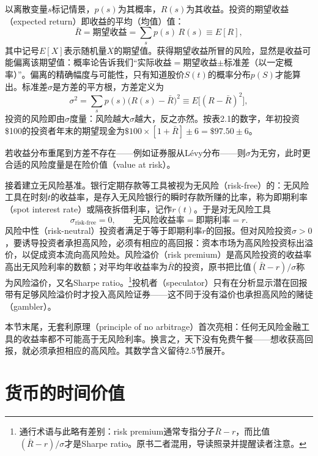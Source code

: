 以离散变量$s$标记情景，$p(s)$为其概率，$R(s)$为其收益。投资的期望收益（expected return）即收益的平均（均值）值：
\begin{equation*}
\bar R=\text{期望收益}=\sum_s p(s)\,R(s)\equiv E[R],
\end{equation*}
其中记号$E[X]$表示随机量$X$的期望值。获得期望收益所冒的风险，显然是收益可能偏离该期望值：概率论告诉我们“实际收益$=$期望收益$\pm$标准差（以一定概率）”。偏离的精确幅度与可能性，只有知道股价$S(t)$的概率分布$p(S)$才能算出。标准差$\sigma$是方差的平方根，方差定义为
\begin{equation*}
\sigma^{2}=\sum_s p(s)\bigl(R(s)-\bar R\bigr)^{2}\equiv E\bigl[(R-\bar R)^{2}\bigr],
\end{equation*}
投资的风险即由$\sigma$度量：风险越大$\sigma$越大，反之亦然。按表2.1的数字，年初投资\$100的投资者年末的期望现金为$\$100\times[1+\bar R]\pm6=\$97.50\pm6$。

若收益分布重尾到方差不存在——例如证券服从Lévy分布——则$\sigma$为无穷，此时更合适的风险度量是在险价值（value at risk）。

接着建立无风险基准。银行定期存款等工具被视为无风险（risk-free）的：无风险工具在时刻$t$的收益率，是存入无风险银行的瞬时存款所赚的比率，称为即期利率（spot interest rate）或隔夜拆借利率，记作$r(t)$。于是对无风险工具
\begin{equation*}
\sigma_{\text{risk-free}}=0,\qquad \text{无风险收益率}=\text{即期利率}=r.
\end{equation*}
风险中性（risk-neutral）投资者满足于等于即期利率$r$的回报。但对风险投资$\sigma>0$，要诱导投资者承担高风险，必须有相应的高回报：资本市场为高风险投资标出溢价，以促成资本流向高风险处。风险溢价（risk premium）是高风险投资的收益率高出无风险利率的数额；对平均年收益率为$\bar R$的投资，原书把比值$(\bar R-r)/\sigma$称为风险溢价，又名Sharpe ratio。\footnote{通行术语与此略有差别：risk premium通常专指分子$\bar R-r$，而比值$(\bar R-r)/\sigma$才是Sharpe ratio。原书二者混用，导读照录并提醒读者注意。}投机者（speculator）只有在分析显示潜在回报带有足够风险溢价时才投入高风险证券——这不同于没有溢价也承担高风险的赌徒（gambler）。

本节末尾，无套利原理（principle of no arbitrage）首次亮相：任何无风险金融工具的收益率都不可能高于无风险利率。换言之，天下没有免费午餐——想收获高回报，就必须承担相应的高风险。其数学含义留待2.5节展开。

\section{货币的时间价值}

